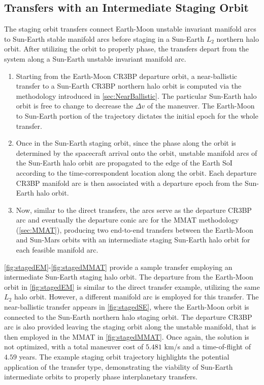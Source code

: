 \subsection{Transfers with an Intermediate Staging Orbit}
The staging orbit transfers connect Earth-Moon unstable invariant manifold arcs to Sun-Earth stable
manifold arcs before staging in a Sun-Earth $L_{2}$ northern halo orbit. After utilizing the orbit
to properly phase, the transfers depart from the system along a Sun-Earth unstable invariant
manifold arc.
\begin{enumerate}
    \item   Starting from the Earth-Moon CR3BP departure orbit, a near-ballistic transfer to a
            Sun-Earth CR3BP northern halo orbit is computed via the methodology introduced in
            \cref{sec:NearBallistic}. The particular Sun-Earth halo orbit is free to change to
            decrease the $\Delta v$ of the maneuver. The Earth-Moon to Sun-Earth portion of the
            trajectory dictates the initial epoch for the whole transfer.
    \item   Once in the Sun-Earth staging orbit, since the phase along the orbit is determined by
            the spacecraft arrival onto the orbit, unstable manifold arcs of the Sun-Earth halo
            orbit are propagated to the edge of the Earth SoI according to the time-correspondent
            location along the orbit. Each departure CR3BP manifold arc is then associated with a
            departure epoch from the Sun-Earth halo orbit.
    \item   Now, similar to the direct transfers, the arcs serve as the departure CR3BP arc and
            eventually the departure conic arc for the MMAT methodology (\cref{sec:MMAT}),
            producing two end-to-end transfers between the Earth-Moon and Sun-Mars orbits with an
            intermediate staging Sun-Earth halo orbit for each feasible manifold arc.
\end{enumerate}
\cref{fig:stagedEM}-\cref{fig:stagedMMAT} provide a sample transfer employing an intermediate
Sun-Earth staging halo orbit. The departure from the Earth-Moon orbit in \cref{fig:stagedEM} is
similar to the direct transfer example, utilizing the same $L_{2}$ halo orbit. However, a different
manifold arc is employed for this transfer. The near-ballistic transfer appears in
\cref{fig:stagedSE}, where the Earth-Moon orbit is connected to the Sun-Earth northern halo staging
orbit. The departure CR3BP arc is also provided leaving the staging orbit along the unstable
manifold, that is then employed in the MMAT in \cref{fig:stagedMMAT}. Once again, the solution is
not optimized, with a total maneuver cost of $5.481$ km/s and a time-of-flight of $4.59$ years. The
example staging orbit trajectory highlights the potential application of the transfer type,
demonstrating the viability of Sun-Earth intermediate orbits to properly phase interplanetary
transfers.

